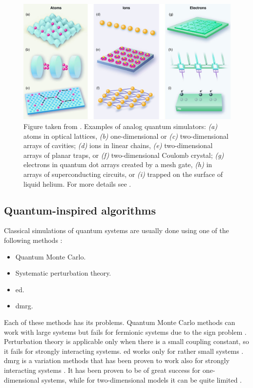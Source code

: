 \begin{figure}[t]
    \centering
    \includegraphics[width=\textwidth]{assets/figures/quantum_simulators.png}
    \caption[Examples of analog quantum simulators]{
        Figure taken from \cite{buluta2009simulators}.
        Examples of analog quantum simulators:
        \emph{(a)} atoms in optical lattices,
        \emph{(b)} one-dimensional or
        \emph{(c)} two-dimensional arrays of cavities;
        \emph{(d)} ions in linear chains,
        \emph{(e)} two-dimensional arrays of planar traps, or
        \emph{(f)} two-dimensional Coulomb crystal;
        \emph{(g)} electrons in quantum dot arrays created by a mesh gate,
        \emph{(h)} in arrays of superconducting circuits, or
        \emph{(i)} trapped on the surface of liquid helium.
        For more details see \cite{buluta2009simulators, georgescu2014simulation}.
    }
    \label{fig:analog_simulators}
\end{figure}


%
%
\subsection{Quantum-inspired algorithms}
\label{sub:quantum_inspired_algorithms}

Classical simulations of quantum systems are usually done using one of the following methods \cite{hauke2012simulators}:
\begin{itemize}[itemsep=0pt]
    \item Quantum Monte Carlo.
    \item Systematic perturbation theory.
    \item \Ac{ed}.
    \item \Ac{dmrg}.
\end{itemize}
Each of these methods has its problems.
Quantum Monte Carlo methods can work with large systems but fails for fermionic systems due to the sign problem \cite{sandvik2010computational, troyer2010computational}.
Perturbation theory is applicable only when there is a small coupling constant, so it fails for strongly interacting systems.
\Ac{ed} works only for rather small systems \cite{sandvik2010computational, troyer2010computational}.
\Ac{dmrg} is a variation methods that has been proven to work also for strongly interacting systems \cite{schollwock2011dmrg, mcculloch2007dmrg, dechiara2008dmrg}.
It has been proven to be of great success for one-dimensional systems, while for two-dimensional models it can be quite limited \cite{stoudenmire2012dmrg}.

